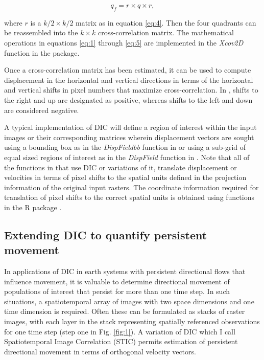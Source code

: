\begin{equation}
q_f = r \times q \times r, 
\label{eq:5}
\end{equation}

\noindent where \(r\) is a \(k/2 \times k/2\) matrix as in equation
\eqref{eq:4}. Then the four quadrants can be reassembled into the
\(k \times k\) cross-correlation matrix. The mathematical operations in
equations \eqref{eq:1} through \eqref{eq:5} are implemented in the
\emph{Xcov2D} function in the  package.

Once a cross-correlation matrix has been estimated, it can be used to
compute displacement in the horizontal and vertical directions in terms
of the horizontal and vertical shifts in pixel numbers that maximize
cross-correlation. In , shifts to the right and
up are designated as positive, whereas shifts to the left and down are
considered negative.

A typical implementation of DIC will define a region of interest within
the input images or their corresponding matrices wherein displacement
vectors are sought using a bounding box as in the \emph{DispFieldbb}
function in  or using a sub-grid of equal sized
regions of interest as in the \emph{DispField} function in
. Note that all of the functions in
 that use DIC or variations of it, translate
displacement or velocities in terms of pixel shifts to the spatial units
defined in the projection information of the original input rasters. The
coordinate information required for translation of pixel shifts to the
correct spatial units is obtained using functions in the 
R package \citep{terra}.

\hypertarget{extending-dic-to-quantify-persistent-movement}{%
\subsection{Extending DIC to quantify persistent
movement}\label{extending-dic-to-quantify-persistent-movement}}

In applications of DIC in earth systems with persistent directional
flows that influence movement, it is valuable to determine directional
movement of populations of interest that persist for more than one time
step. In such situations, a spatiotemporal array of images with two
space dimensions and one time dimension is required. Often these can be
formulated as stacks of raster images, with each layer in the stack
representing spatially referenced observations for one time step (step
one in Fig. \ref{fig:1}). A variation of DIC which I call Spatiotemporal
Image Correlation (STIC) permits estimation of persistent directional
movement in terms of orthogonal velocity vectors.


